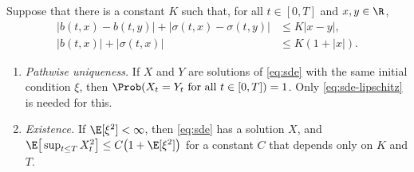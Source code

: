 \begin{theorem}\label{thm:sde-existence}
Suppose that there is a constant $K$ such that, for all $t\in[0,T]$ and $x,y\in\R$,
\begin{align}
  |b(t,x)-b(t,y)|+|\sigma(t,x)-\sigma(t,y)|&\le K|x-y|,\label{eq:sde-lipschitz}\\
  |b(t,x)|+|\sigma(t,x)|&\le K(1+|x|).\label{eq:sde-growth}
\end{align}
\begin{enumerate}[label=(\alph*)]
  \item \emph{Pathwise uniqueness.} If $X$ and $Y$ are solutions of \eqref{eq:sde} with the
    same initial condition $\xi$, then $\Prob(X_t=Y_t\text{ for all }t\in[0,T])=1$. Only
    \eqref{eq:sde-lipschitz} is needed for this.
  \item \emph{Existence.} If $\E[\xi^2]<\infty$, then \eqref{eq:sde} has a solution $X$, and
    $\E\big[\sup_{t\le T}X_t^2\big]\le C\big(1+\E[\xi^2]\big)$ for a constant $C$ that
    depends only on $K$ and $T$.
\end{enumerate}
\end{theorem}


